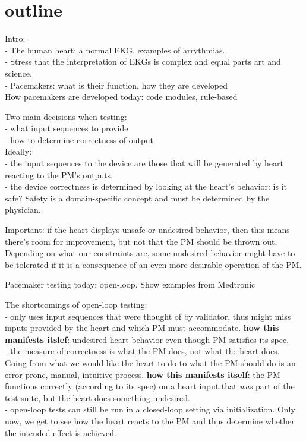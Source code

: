 \section{outline}

Intro:\\
- The human heart: a normal EKG, examples of arrythmias.
\\
- Stress that the interpretation of EKGs is complex and equal parts art and science.
\\
- Pacemakers: what is their function, how they are developed
\\
How pacemakers are developed today: code modules, rule-based

Two main decisions when testing:\\
- what input sequences to provide\\
- how to determine correctness of output\\
Ideally:\\
- the input sequences to the device are those that will be generated by heart reacting to the PM's outputs.
\\
- the device correctness is determined by looking at the heart's behavior: is it safe? Safety is a domain-specific concept and must be determined by the physician.

Important: if the heart displays unsafe or undesired behavior, then this means there's room for improvement, but not that the PM should be thrown out. Depending on what our constraints are, some undesired behavior might have to be tolerated if it is a consequence of an even more desirable operation of the PM.

Pacemaker testing today: open-loop. 
Show examples from Medtronic

The shortcomings of open-loop testing:
\\
- only uses input sequences that were thought of by validator, thus might miss inputs provided by the heart and which PM must accommodate. \textbf{how this manifests itslef}: undesired heart behavior even though PM satisfies its spec.
\\
- the measure of correctness is what the PM does, not what the heart does. Going from what we would like the heart to do to what the PM should do is an error-prone, manual, intuitive process.
\textbf{how this manifests itself}: the PM functions correctly (according to its spec) on a heart input that \emph{was} part of the test suite, but the heart does something undesired.
\\
- open-loop tests can still be run in a closed-loop setting via initialization. Only now, we get to see how the heart reacts to the PM and thus determine whether the intended effect is achieved. 


